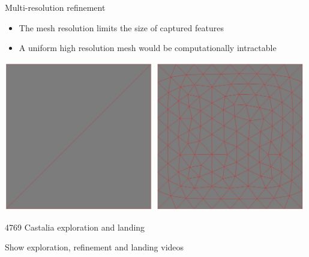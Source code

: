\begin{frame}{Multi-resolution refinement}
    \begin{itemize}
        \item The mesh resolution limits the size of captured features
        \item A uniform high resolution mesh would be computationally intractable
    \end{itemize}
    \begin{center}%
        \includegraphics[width=0.49\textwidth]{figures/computational_geometry/isotropic/original_cube.jpg}%
        \includegraphics[width=0.49\textwidth]{figures/computational_geometry/isotropic/remesh_cube.jpg}
    \end{center}
\end{frame}

\begin{frame}{4769 Castalia exploration and landing}
    \begin{center}
        Show exploration, refinement and landing videos
    \end{center}
\end{frame}

